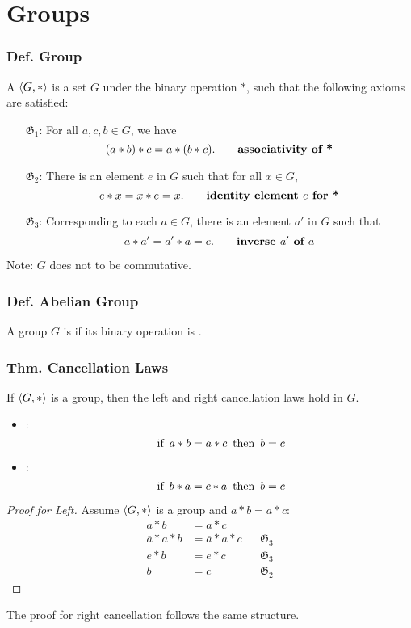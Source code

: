 \section{Groups}

\subsubsection{Def. Group}
A  $\langle G,* \rangle$ is a set $G$  under the binary operation $*$, such that the following axioms are satisfied:
\begin{enumerate}
    \item[$\mathfrak{G}_1$:] For all $a,c,b \in G$, we have
    \[
        (a*b)*c = a*(b*c). \qquad \textbf{associativity of *}
    \]
    \item[$\mathfrak{G}_2$:] There is an element $e$ in $G$ such that for all $x \in G$,
    \[
        e*x=x*e=x. \qquad \textbf{identity element $e$ for *}
    \]
    \item[$\mathfrak{G}_3$:] Corresponding to each $a \in G$, there is an element $a'$ in $G$ such that
    \[
        a*a'=a'*a=e. \qquad \textbf{inverse $a'$ of $a$}
    \]
\end{enumerate}
Note: $G$ does not  to be commutative.

\subsubsection{Def. Abelian Group}
A group $G$ is  if its binary operation is .

\subsubsection{Thm. Cancellation Laws}
If $\langle G, * \rangle$ is a group, then the left and right cancellation laws hold in $G$.
\begin{itemize}
    \item {}:
    \[
        \operatorname{~\text{if}~} a*b = a*c \operatorname{~\text{then}~} b = c
    \]
    \item {}:
    \[
        \operatorname{~\text{if}~} b*a = c*a \operatorname{~\text{then}~} b = c
    \]
\end{itemize}
\begin{proof}[Proof for Left]
    Assume $\langle G,* \rangle$ is a group and $a*b=a*c$:
    \begin{align*}
        a*b & = a*c \\
        \overline{a}*a*b & = \overline{a}*a*c && \mathfrak{G}_3 \\
        e*b & = e*c && \mathfrak{G}_3 \\
        b & = c && \mathfrak{G}_2
    \end{align*}
\end{proof}
The proof for right cancellation follows the same structure.

